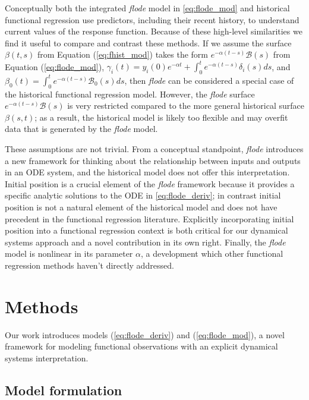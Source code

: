 \documentclass[preprint]{JASA}
\begin{document}
Conceptually both the integrated \emph{flode} model in
\ref{eq:flode_mod} and historical functional regression use predictors,
including their recent history, to understand current values of the
response function. Because of these high-level similarities we find it
useful to compare and contrast these methods. If we assume the surface
\(\beta(t,s)\) from Equation (\ref{eq:fhist_mod}) takes the form
\(e^{-\alpha (t-s)} \mathcal{B}(s)\) from Equation (\ref{eq:flode_mod}),
\(\gamma_i(t) = y_i(0)e^{-\alpha t} + \int_0^t e^{-\alpha (t-s)}\delta_i(s)ds\),
and \(\beta_0(t) = \int_0^t e^{-\alpha (t-s)}\mathcal{B}_0(s)ds\), then
\emph{flode} can be considered a special case of the historical
functional regression model. However, the \emph{flode} surface
\(e^{-\alpha (t-s)} \mathcal{B}(s)\) is very restricted compared to the
more general historical surface \(\beta(s,t)\); as a result, the
historical model is likely too flexible and may overfit data that is
generated by the \emph{flode} model.

These assumptions are not trivial. From a conceptual standpoint,
\emph{flode} introduces a new framework for thinking about the
relationship between inputs and outputs in an ODE system, and the
historical model does not offer this interpretation. Initial position is
a crucial element of the \emph{flode} framework because it provides a
specific analytic solutions to the ODE in \ref{eq:flode_deriv}; in
contrast initial position is not a natural element of the historical
model and does not have precedent in the functional regression
literature. Explicitly incorporating initial position into a functional
regression context is both critical for our dynamical systems approach
and a novel contribution in its own right. Finally, the \emph{flode}
model is nonlinear in its parameter \(\alpha\), a development which
other functional regression methods haven't directly addressed.

\hypertarget{methods}{%
\section{Methods}\label{methods}}

\label{sec:methods}

Our work introduces models (\ref{eq:flode_deriv}) and
(\ref{eq:flode_mod}), a novel framework for modeling functional
observations with an explicit dynamical systems interpretation.

\hypertarget{model-formulation}{%
\subsection{Model formulation}\label{model-formulation}}
\end{document}
